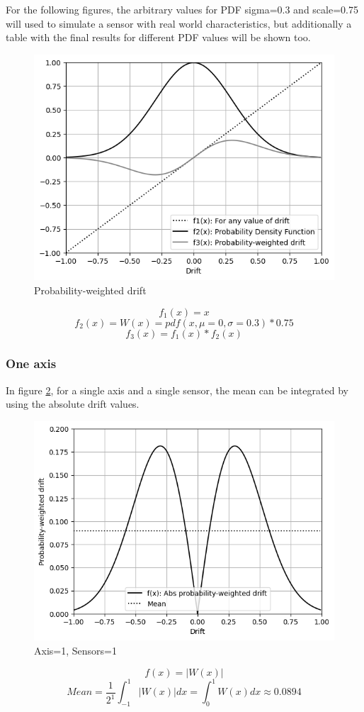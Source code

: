 \documentclass[10pt, twocolumn, a4paper]{article}
\begin{document}
            For the following figures, the arbitrary values for PDF sigma=0.3 and scale=0.75 will used to simulate a sensor with real world characteristics, but additionally a table with the final results for different PDF values will be shown too.
            \begin{figure}[H]
                \begin{center}
                    \caption{Probability-weighted drift}
                    \label{fig_rate_1a}
                    \includegraphics[width=0.8\linewidth]{figure_drift_1a.png}
                \end{center}
            \end{figure}
            $$ f_1(x) = x $$
            $$ f_2(x) = W(x) = pdf(x, \mu=0, \sigma=0.3) * 0.75 $$
            $$ f_3(x) = f_1(x)*f_2(x) $$

        \subsubsection{One axis}
            In figure \ref{fig_zero_11}, for a single axis and a single sensor, the mean can be integrated by using the absolute drift values.
            \begin{figure}[H]
                \begin{center}
                    \caption{Axis=1, Sensors=1}
                    \label{fig_zero_11}
                    \includegraphics[width=0.8\linewidth]{figure_drift_1b.png}
                \end{center}
            \end{figure}
            \vspace{-8mm}
            $$ f(x) = |W(x)| $$
            $$ Mean = \frac{1}{2^1} \int_{-1}^1 |W(x)| dx = \int_0^1 W(x) dx \approx 0.0894 $$
\end{document}
